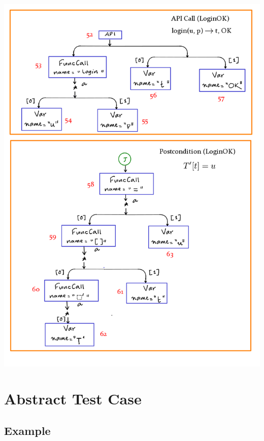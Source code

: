 \documentclass[12pts, a4paper]{article}
\begin{document}
\begin{center}
\includegraphics[width=\textwidth]{../images/spec-AST-8.png}
\end{center}

\section{Abstract Test Case}
\subsection{Example}
\end{document}
